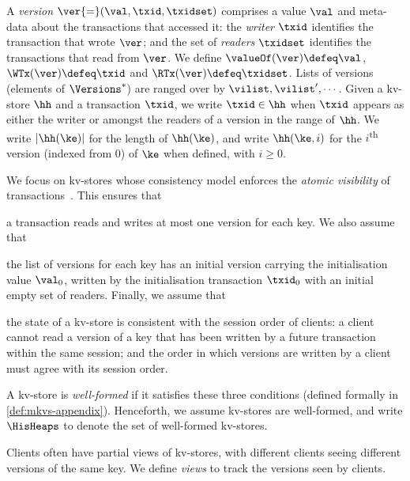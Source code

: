 A \emph{version} $\ver {=} (\val, \txid, \txidset)$ comprises  a value $\val$
and meta-data about the transactions that accessed it: the \emph{writer} $\txid$ identifies the transaction that wrote $\ver$;
and the set of \emph{readers} $\txidset$ identifies  the  transactions
that read from  $\ver$.
We define $\valueOf(\ver) \defeq \val$,
$\WTx(\ver) \defeq \txid$ and $\RTx(\ver) \defeq \txidset$. 
Lists of versions (elements of $\Versions^{\ast}$) are ranged over by $\vilist, \vilist',\cdots$.
Given a kv-store $\hh$ and a transaction $\txid$, we write 
$\txid \in \hh$ when $\txid$ appears as either the writer or amongst the readers of a version in the range of $\hh$.
We write  $\lvert \hh(\ke) \rvert$ for the length of $\hh(\ke)$, 
and write $\hh(\ke, i)$ for the $i$\textsuperscript{th} version (indexed from 0) of $\ke$ when defined, with $i \geq 0$.


We focus on kv-stores whose consistency model enforces the \emph{atomic visibility} of transactions~\cite{framework-concur}. 
This ensures that 
\begin{enumerate*}
	\item a transaction reads and writes at most one version for each key.
We also assume that 
	\item the list of versions for each key has an initial version 
carrying the initialisation value $\val_0$,  written by the 
initialisation transaction $\txid_0$ 
with an initial empty set of readers.
Finally, we assume that 
	\item the state of a kv-store is consistent with 
the session order of clients: a client cannot read a version of a key that has 
been written by a future transaction within the same session;  and 
the order in which versions are written by a client must agree 
with its session order. 
\end{enumerate*}
A kv-store is \emph{well-formed} if it satisfies these three conditions (defined formally in \cref{def:mkvs-appendix}). 
Henceforth, we assume kv-stores are well-formed, and write  $\HisHeaps$ to denote 
the set of well-formed kv-stores.

Clients often have partial views of kv-stores, 
with different clients seeing 
different versions of the same key.
We define \emph{views} to track the versions seen by clients. 

